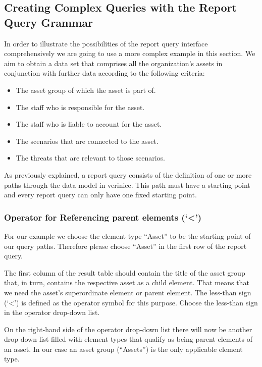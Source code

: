 \documentclass[a4paper,10pt]{book}
\providecommand{\tightlist}{%
  \setlength{\itemsep}{0pt}\setlength{\parskip}{0pt}}
\begin{document}
\subsection{Creating Complex Queries with the Report Query
Grammar}\label{creating-complex-queries-with-the-report-query-grammar}

In order to illustrate the possibilities of the report query interface
comprehensively we are going to use a more complex example in this section. We
aim to obtain a data set that comprises all the organization's assets in
conjunction with further data according to the following criteria:

\begin{itemize}
\tightlist
\item
  The asset group of which the asset is part of.
\item
  The staff who is responsible for the asset.
\item
  The staff who is liable to account for the asset.
\item
  The scenarios that are connected to the asset.
\item
  The threats that are relevant to those scenarios.
\end{itemize}

As previously explained, a report query consists of the definition of one or
more paths through the data model in verinice. This path must have a starting
point and every report query can only have one fixed starting point.

\subsubsection{\texorpdfstring{Operator for Referencing parent elements
(`\textless{}')}{Operator for Referencing parent elements (\textless{})}}\label{operator-for-referencing-parent-elements}

For our example we choose the element type ``Asset'' to be the starting point of
our query paths. Therefore please choose ``Asset'' in the first row of the
report query.

The first column of the result table should contain the title of the asset group
that, in turn, contains the respective asset as a child element. That means that
we need the asset's superordinate element or parent element. The less-than sign
(`\textless{}') is defined as the operator symbol for this purpose. Choose the
less-than sign in the operator drop-down list.

On the right-hand side of the operator drop-down list there will now be another
drop-down list filled with element types that qualify as being parent elements
of an asset. In our case an asset group (``Assets'') is the only applicable
element type.
\end{document}
